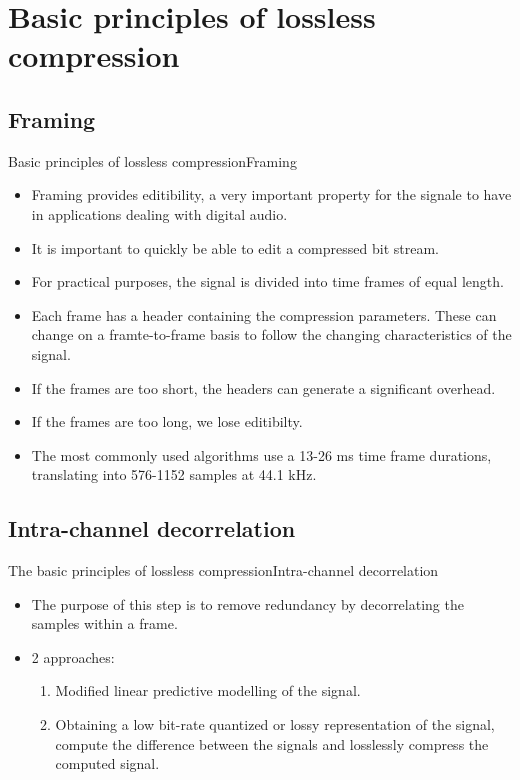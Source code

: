 \documentclass{beamer}
\begin{document}
\section{ Basic principles of lossless compression}
\subsection{Framing}
\begin{frame}{Basic principles of lossless compression}{Framing}
	\begin{itemize}[<+->]
		\item{
			Framing provides editibility, a very important property for the signale to have in applications dealing with digital audio.
		}
		\item{
			It is important to quickly be able to edit a compressed bit stream.
		}
		\item{
			For practical purposes, the signal is divided into time frames of equal length.
		}
		\item{
			Each frame has a header containing the compression parameters. These can change on a framte-to-frame basis to follow the changing characteristics of the signal.
		}
		\item{
			If the frames are too short, the headers can generate a significant overhead.
		}
		\item{
			If the frames are too long, we lose editibilty.
		}
		\item{
			The most commonly used algorithms use a 13-26 ms time frame durations, translating into 576-1152 samples at 44.1 kHz.
		}
	\end{itemize}
\end{frame}

\subsection{Intra-channel decorrelation}
\begin{frame}{The basic principles of lossless compression}{Intra-channel decorrelation}
	\begin{itemize}[<+->]
		\item{
			The purpose of this step is to remove redundancy by decorrelating the samples within a frame.
		}
		\item{
			2 approaches:
		}
		\begin{enumerate}
			\item{
				Modified linear predictive modelling of the signal.
			}
			\item{
				Obtaining a low bit-rate quantized or lossy representation of the signal, compute the difference between the signals and losslessly compress the computed signal.
			}
		\end{enumerate}
	\end{itemize}
\end{frame}
\end{document}
